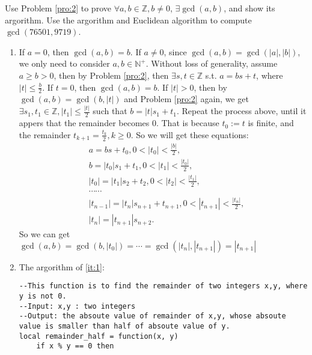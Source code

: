 \documentclass{ctexart}
\begin{document}
\begin{problem}
	Use Problem \ref{pro:2} to prove \(\forall a,b \in \mathbb{Z}, b \neq 0\), \(\exists \gcd(a,b)\), and show its argorithm.
	Use the argorithm and Euclidean algorithm to compute \(\gcd(76501,9719)\).
\end{problem}
\begin{solution}
	\begin{enumerate}
		\item \label{it:1} If \(a =0\), then \(\gcd(a,b) = b\).
			If \(a \neq 0\), since \(\gcd(a,b) = \gcd(|a|,|b|)\), we only need to consider \(a,b \in \mathbb{N}^+\).
			Without loss of generality, assume \(a \geq b > 0\), then by
			Problem \ref{pro:2}, then \(\exists s, t \in \mathbb{Z}\) s.t. \(a = bs + t\), where \(|t| \leq \frac{b}{2}\).
			If \(t=0\), then \(\gcd(a,b) =b\). If \(|t| >0\), then by \(\gcd(a,b) = \gcd(b,|t|)\) and Problem \ref{pro:2} again, we get \(\exists s_1,t_1 \in \mathbb{Z}, |t_1| \leq \frac{|t|}{2}\) such that
			\(b = |t|s_1 + t_1\). Repeat the process above, until it appers that the remainder becomes \(0\).
			That is because \(t_0:=t\) is finite, and the remainder \( t_{k + 1} = \frac{t_k}{2}, k \geq 0\).
			So we will get these equations:
			\begin{equation}
				\begin{aligned}
					 & a = bs + t_0, 0 < |t_0| < \frac{|b|}{2},                           \\
					 & b = |t_0|s_1 + t_1, 0 < |t_1| < \frac{|t_0|}{2},                   \\
					 & |t_0| = |t_1|s_2 + t_2, 0 < |t_2| < \frac{|t_1|}{2},               \\
					 & \cdots\cdots                                                       \\
					 & |t_{n-1}| = |t_{n}|s_{n+1}+t_{n+1}, 0< |t_{n+1}| <\frac{|t_n|}{2}, \\
					 & |t_{n}| = |t_{n+1}|s_{n+2}.
				\end{aligned}
			\end{equation}
			So we can get \(\gcd(a,b)=\gcd(b,|t_0|)=\cdots=\gcd(|t_n|,|t_{n+1}|)=|t_{n+1}|\)
		\item The argorithm of \ref{it:1}:
			\begin{lstlisting}[style=lua]
--This function is to find the remainder of two integers x,y, where y is not 0.
--Input: x,y : two integers
--Output: the absoute value of remainder of x,y, whose absoute value is smaller than half of absoute value of y.
local remainder_half = function(x, y)
	if x % y == 0 then

\end{lstlisting}
\end{enumerate}
\end{solution}
\end{document}
